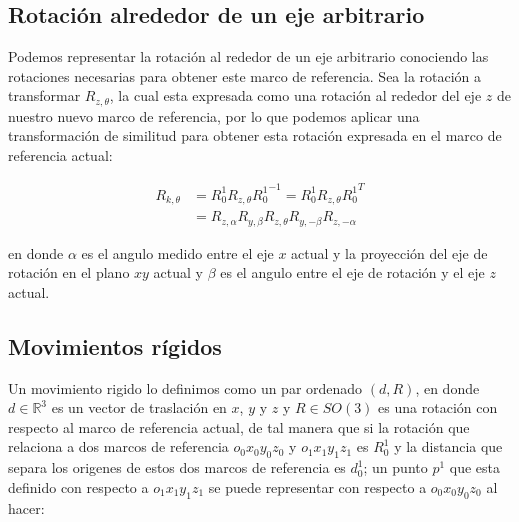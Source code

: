 \begin{multicols*}{3}
            \begin{center}
            \end{center}


        \subsection{Rotación alrededor de un eje arbitrario}

            \begin{center}
            \end{center}

            Podemos representar la rotación al rededor de un eje arbitrario conociendo las rotaciones necesarias para obtener este marco de referencia. Sea la rotación a transformar $R_{z, \theta}$, la cual esta expresada como una rotación al rededor del eje $z$ de nuestro nuevo marco de referencia, por lo que podemos aplicar una transformación de similitud para obtener esta rotación expresada en el marco de referencia actual:

            \begin{align}
                R_{k, \theta} &= R_0^1 R_{z, \theta} {R_0^1}^{-1} = R_0^1 R_{z, \theta} {R_0^1}^{T} \nonumber \\
                &= R_{z, \alpha} R_{y, \beta} R_{z, \theta} R_{y, -\beta} R_{z, -\alpha}
            \end{align}

            en donde $\alpha$ es el angulo medido entre el eje $x$ actual y la proyección del eje de rotación en el plano $xy$ actual y $\beta$ es el angulo entre el eje de rotación y el eje $z$ actual.


        \subsection{Movimientos rígidos}

            Un movimiento rigido lo definimos como un par ordenado $(d, R)$, en donde $d \in \mathbb{R}^3$ es un vector de traslación en $x$, $y$ y $z$ y $R \in SO(3)$ es una rotación con respecto al marco de referencia actual, de tal manera que si la rotación que relaciona a dos marcos de referencia $o_0 x_0 y_0 z_0$ y $o_1 x_1 y_1 z_1$ es $R_0^1$ y la distancia que separa los origenes de estos dos marcos de referencia es $d_0^1$; un punto $p^1$ que esta definido con respecto a $o_1 x_1 y_1 z_1$ se puede representar con respecto a $o_0 x_0 y_0 z_0$ al hacer:


\end{multicols*}
